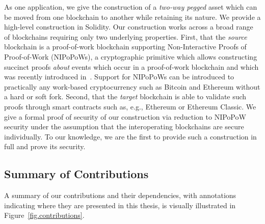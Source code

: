 \ifdraft
{}
As one application, we give the
construction of a \emph{two-way pegged} asset which can be moved from one
blockchain to another while retaining its nature. We provide a high-level
construction in Solidity. Our construction works across a broad range of
blockchains requiring only two underlying properties. First, that the
\emph{source} blockchain is a proof-of-work blockchain supporting
Non-Interactive Proofs of Proof-of-Work (NIPoPoWs), a cryptographic primitive
which allows constructing succinct proofs \emph{about} events which occur in a
proof-of-work blockchain and which was recently introduced in~\cite{nipopows}.
Support for NIPoPoWs can be introduced to practically any
work-based cryptocurrency such as Bitcoin and Ethereum without a hard or soft
fork. Second, that the \emph{target} blockchain is able to validate such proofs
through smart contracts such as, e.g., Ethereum or Ethereum
Classic.
We give a formal proof of security of our construction via
reduction to NIPoPoW security under the assumption that the interoperating
blockchains are secure individually.
To our knowledge, we are the first to
provide such a construction in
full and prove its security.
\fi

\subsection{Summary of Contributions}
A summary of our contributions and their dependencies, with annotations
indicating where they are presented in this thesis, is visually illustrated in
Figure~\ref{fig.contributions}.

